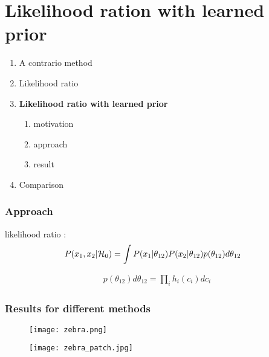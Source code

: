\documentclass[compress]{beamer} %
\begin{document}
 \section{Likelihood ration with learned prior}
 \begin{frame}
 \scriptsize
 {
 \begin{enumerate}


  \item A contrario method
  \item Likelihood ratio
  \item \textbf{Likelihood ratio with learned prior}
  \begin{enumerate}
   \item motivation
   \item approach
   \item result
  \end{enumerate}

  \item Comparison
  
 \end{enumerate}

  
 }
 \end{frame} 
 
 \begin{frame}
  \frametitle{Approach}
  likelihood ratio :
  \[
  \begin{split}
   P(x_1,x_2 \arrowvert \mathcal{H}_0)&=\int P(x_1 \arrowvert \theta_{12}) P(x_2 \arrowvert \theta_{12}) p(\theta_{12}) d\theta_{12}
  \end{split}
  \]
  
  \[
  \begin{split}
   p(\theta_{12}) d\theta_{12}=\prod_i h_i(c_i)dc_i
  \end{split}
  \]
 \end{frame}


\begin{frame}
\frametitle{Results for different methods}
\begin{figure}
\centering
\begin{minipage}{0.7\linewidth}
\texttt{[image: zebra.png]}
\end{minipage}
\begin{minipage}{0.2\linewidth}
\texttt{[image: zebra\_patch.jpg]}
\end{minipage}
\end{figure}
\end{frame}
\end{document}
